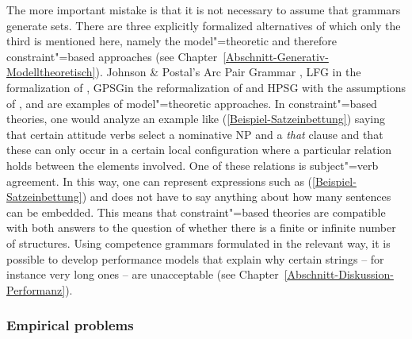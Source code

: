 The more important mistake is that it is not necessary to assume that grammars generate
sets. There are three explicitly formalized alternatives of which only the third is mentioned here,
namely the model"=theoretic and therefore constraint"=based approaches (see 
Chapter~\ref{Abschnitt-Generativ-Modelltheoretisch}). Johnson \& Postal's Arc Pair Grammar \citeyearpar{JP80a-u}, LFG\indexlfg
in the formalization of \citet{Kaplan95a}, GPSG\indexgpsg in the reformalization of \citet{Rogers97a} and HPSG\indexhpsg
with the assumptions of \citet{King99a-u}, \citet{Pollard99a} and \citet{Richter2007a} are examples of model"=theoretic approaches.
In constraint"=based theories, one would analyze an example like (\ref{Beispiel-Satzeinbettung}) saying that certain attitude verbs select a nominative NP and a 
\emph{that} clause and that these can only occur in a certain local configuration where a particular relation holds between the elements involved.
One of these relations is subject"=verb agreement. In this way, one can represent expressions such as (\ref{Beispiel-Satzeinbettung})
and does not have to say anything about how many sentences can be embedded.
This means that constraint"=based theories are compatible with both answers to the question of whether there is a finite or infinite number of structures.
Using competence grammars formulated in the relevant way, it is possible to develop performance
models that explain why certain strings -- for instance very long ones -- are unacceptable
(see Chapter~\ref{Abschnitt-Diskussion-Performanz}).

\subsubsection{Empirical problems}
\label{sec-recursion-empirical-problems}

